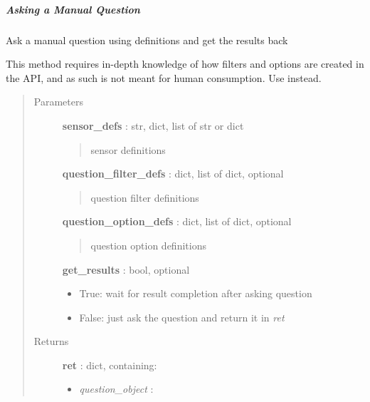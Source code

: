 \documentclass[letterpaper,10pt,english]{sphinxmanual}
\begin{document}
\subparagraph{Asking a Manual Question}
\label{pytan.handler:asking-a-manual-question}

\begin{fulllineitems}
\label{pytan.handler:pytan.handler.Handler.ask_manual}
Ask a manual question using definitions and get the results back

This method requires in-depth knowledge of how filters and options are created in the API,
and as such is not meant for human consumption. Use {\hyperref[pytan.handler:pytan.handler.Handler.ask_manual_human]{}} instead.
\begin{quote}\begin{description}
\item[{Parameters}] \leavevmode
\textbf{sensor\_defs} : str, dict, list of str or dict
\begin{quote}

sensor definitions
\end{quote}

\textbf{question\_filter\_defs} : dict, list of dict, optional
\begin{quote}

question filter definitions
\end{quote}

\textbf{question\_option\_defs} : dict, list of dict, optional
\begin{quote}

question option definitions
\end{quote}

\textbf{get\_results} : bool, optional
\begin{itemize}
\item {} 
True: wait for result completion after asking question

\item {} 
False: just ask the question and return it in \emph{ret}

\end{itemize}

\item[{Returns}] \leavevmode
\textbf{ret} : dict, containing:
\begin{itemize}
\item {} 
\emph{question\_object} : {\hyperref[taniumpy.object_types:taniumpy.object_types.question.Question]{}}


\end{itemize}
\end{description}
\end{quote}
\end{fulllineitems}
\end{document}
